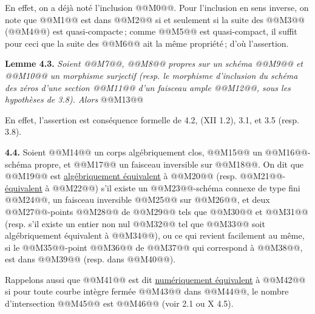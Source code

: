 
En
effet, on a d\'ej\`a not\'e l'inclusion @@M0@@. Pour l'inclusion en sens inverse, on note que @@M1@@ est dans @@M2@@ si et seulement si la suite des @@M3@@ (@@M4@@) est quasi-compacte\,; comme @@M5@@ est quasi-compact, il suffit pour ceci que la suite des @@M6@@ ait la m\^eme propri\'et\'e\,; d'o\`u l'assertion.

\textbf{Lemme 4.3.} \emph{Soient @@M7@@, @@M8@@ propres sur un sch\'ema @@M9@@ et @@M10@@ un morphisme surjectif (resp. le morphisme d'inclusion du sch\'ema des z\'eros d'une section @@M11@@ d'un faisceau ample @@M12@@, sous les hypothèses de 3.8). Alors}
@@M13@@

En effet, l'assertion est cons\'equence formelle de 4.2, (XII 1.2), 3.1, et 3.5 (resp. 3.8).

\textbf{4.4.} Soient @@M14@@ un corps alg\'ebriquement clos, @@M15@@ un @@M16@@-sch\'ema propre, et @@M17@@ un faisceau inversible sur @@M18@@. On dit que @@M19@@ est \uline{alg\'ebriquement \'equivalent} \`a @@M20@@ (resp. @@M21@@-\uline{\'equivalent} \`a @@M22@@) s'il existe un @@M23@@-sch\'ema connexe de type fini @@M24@@, un faisceau inversible @@M25@@ sur @@M26@@, et deux @@M27@@-points @@M28@@ de @@M29@@ tels que @@M30@@ et @@M31@@ (resp. s'il existe un entier non nul @@M32@@ tel que @@M33@@ soit alg\'ebriquement \'equivalent \`a @@M34@@), ou ce qui revient facilement au m\^eme, si le @@M35@@-point @@M36@@ de @@M37@@ qui correspond \`a @@M38@@, est dans @@M39@@ (resp. dans @@M40@@).

Rappelons aussi que @@M41@@ est dit \uline{num\'eriquement \'equivalent} \`a @@M42@@ si pour toute courbe int\`egre ferm\'ee @@M43@@ dans @@M44@@, le nombre d'intersection @@M45@@ est @@M46@@ (voir 2.1 ou X 4.5).

